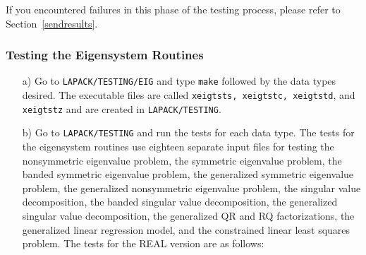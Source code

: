 If you encountered failures in this phase of the testing process, please
refer to Section~\ref{sendresults}.

\subsubsection{Testing the Eigensystem Routines}\label{testeig}

\begin{itemize}

\item[a)]
Go to {\tt LAPACK/TESTING/EIG} and type {\tt make} followed by the data types
desired.  The executable files are called {\tt xeigtsts,
xeigtstc, xeigtstd}, and {\tt xeigtstz} and are created
in {\tt LAPACK/TESTING}.

\item[b)]
Go to {\tt LAPACK/TESTING} and run the tests for each data type.
The tests for the eigensystem routines use eighteen separate input files
for testing the nonsymmetric eigenvalue problem,
the symmetric eigenvalue problem, the banded symmetric eigenvalue
problem, the generalized symmetric eigenvalue
problem, the generalized nonsymmetric eigenvalue problem, the
singular value decomposition, the banded singular value decomposition,
the generalized singular value
decomposition, the generalized QR and RQ factorizations, the generalized
linear regression model, and the constrained linear least squares
problem.
The tests for the REAL version are as follows:
\end{itemize}
